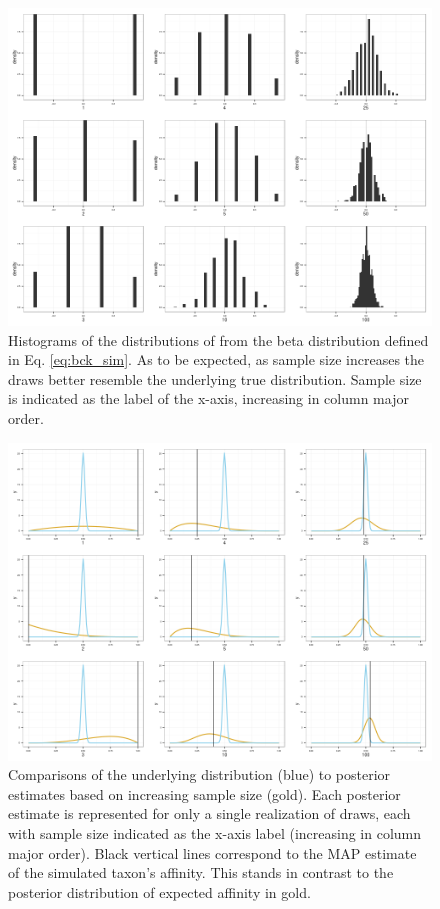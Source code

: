 \documentclass[12pt,letterpaper]{article}
\begin{document}
\begin{figure}[ht]
  \centering
  \includegraphics[height = \textheight,width=\textwidth,keepaspectratio=true]{figure/env_mode_dist}
  \caption{Histograms of the distributions of from the beta distribution defined in Eq. \ref{eq:bck_sim}. As to be expected, as sample size increases the draws better resemble the underlying true distribution. Sample size is indicated as the label of the x-axis, increasing in column major order.}
  \label{fig:env_mode}
\end{figure}

\begin{figure}[ht]
  \centering
  \includegraphics[height = \textheight,width=\textwidth,keepaspectratio=true]{figure/env_post_inspect}
  \caption{Comparisons of the underlying distribution (blue) to posterior estimates based on increasing sample size (gold). Each posterior estimate is represented for only a single realization of draws, each with sample size indicated as the x-axis label (increasing in column major order). Black vertical lines correspond to the MAP estimate of the simulated taxon's affinity. This stands in contrast to the posterior distribution of expected affinity in gold.}
  \label{fig:env_post}
\end{figure}
\end{document}
